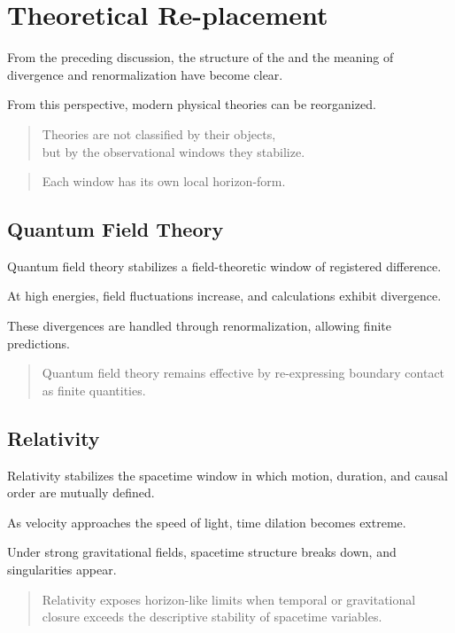 \section{Theoretical Re-placement}

\label{sec:replacement}

From the preceding discussion,
the structure of the \DH{}
and the meaning of divergence and renormalization
have become clear.

From this perspective,
modern physical theories can be reorganized.

\medskip
\begin{quote}
Theories are not classified by their objects,\\
but by the observational windows they stabilize.
\end{quote}

\begin{quote}
Each window has its own local horizon-form.
\end{quote}
\medskip

\subsection{Quantum Field Theory}

Quantum field theory stabilizes a field-theoretic window
of registered difference.

At high energies,
field fluctuations increase,
and calculations exhibit divergence.

These divergences are handled through renormalization,
allowing finite predictions.

\medskip
\begin{quote}
Quantum field theory remains effective by re-expressing
boundary contact as finite quantities.
\end{quote}
\medskip

\subsection{Relativity}

Relativity stabilizes the spacetime window
in which motion,
duration,
and causal order are mutually defined.

As velocity approaches the speed of light,
time dilation becomes extreme.

Under strong gravitational fields,
spacetime structure breaks down,
and singularities appear.

\medskip
\begin{quote}
Relativity exposes horizon-like limits
when temporal or gravitational closure exceeds
the descriptive stability of spacetime variables.
\end{quote}
\medskip

